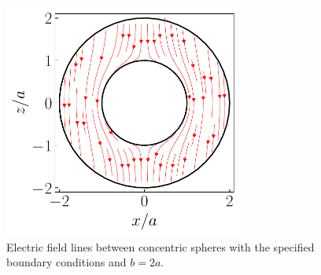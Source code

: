 {\begin{figure}[h!tb]
   \centering
   \includegraphics[width=0.7\textwidth]{prob3.pdf}
   \caption{Electric field lines between concentric spheres with the specified boundary conditions and $b = 2a$.}
\end{figure}



}




